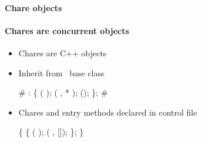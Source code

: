 \begin{frame}[fragile] 
\secframetitle{\ssCharm}
\framesubtitle{Chare objects}
\framesubtitle{Chares are concurrent objects}
\begin{itemize}
\item Chares are C++ objects
\item Inherit from \charm\ base class
\footnotesize
\begin{semiverbatim}
# 
  :   \{
    ( );
     ( ,  * );
     ();
\};
# 
\end{semiverbatim}
\normalsize
\item Chares and entry methods declared in  control file
\footnotesize
\begin{semiverbatim}
 \{
     \{
        ( );
        ( ,  []);
   \};
\}
\end{semiverbatim}
\end{itemize}
\end{frame}

